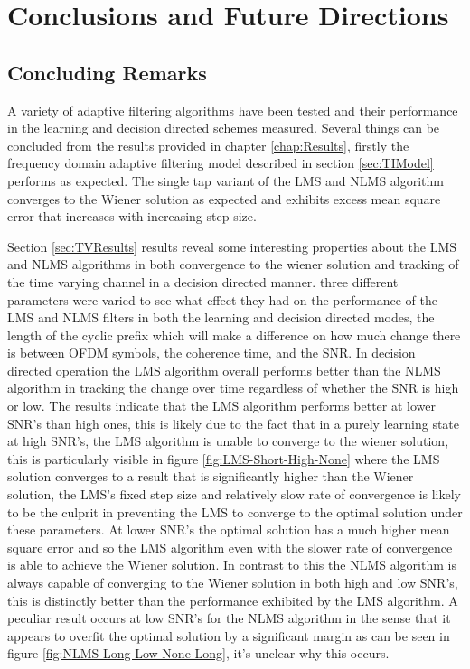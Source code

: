 \chapter{Conclusions and Future Directions}
\label{chap:Conclusion}

\section{Concluding Remarks}

A variety of adaptive filtering algorithms have been tested %
and their performance in the learning and decision directed %
schemes measured. Several things can be concluded from the %
results provided in chapter \ref{chap:Results}, firstly the %
frequency domain adaptive filtering model described in section %
\ref{sec:TIModel} performs as expected. The single tap %
variant of the LMS and NLMS algorithm converges to the %
Wiener solution as expected and exhibits excess mean square error %
that increases with increasing step size. 

Section \ref{sec:TVResults} %
results reveal some interesting properties about the LMS and %
NLMS algorithms in both convergence to the wiener solution and tracking %
of the time varying channel in a decision directed manner. three different %
parameters were varied to see what effect they had on the performance %
of the LMS and NLMS filters in both the learning and decision directed modes, %
the length of the cyclic prefix which will make a difference on how much change %
there is between OFDM symbols, the coherence time, and the SNR. In %
decision directed operation the LMS algorithm overall performs better than %
the NLMS algorithm in tracking the change over time regardless of whether %
the SNR is high or low. The results indicate that the LMS algorithm performs better %
at lower SNR's than high ones, this is likely due to the fact that in a purely %
learning state at high SNR's, the LMS algorithm is unable to converge to the %
wiener solution, this is particularly visible in figure \ref{fig:LMS-Short-High-None} where %
the LMS solution converges to a result that is significantly higher than the %
Wiener solution, the LMS's fixed step size and relatively slow rate of convergence %
is likely to be the culprit in preventing the LMS to converge to the optimal %
solution under these parameters. At lower SNR's the optimal solution has a %
much higher mean square error and so the LMS algorithm even with the slower %
rate of convergence is able to achieve the Wiener solution. %
In contrast to this the NLMS algorithm is always capable of converging to the %
Wiener solution in both high and low SNR's, this is distinctly better than %
the performance exhibited by the LMS algorithm. A peculiar result occurs at %
low SNR's for the NLMS algorithm in the sense that it appears to overfit the %
optimal solution by a significant margin as can be seen in figure %
\ref{fig:NLMS-Long-Low-None-Long}, it's unclear why this occurs. %

